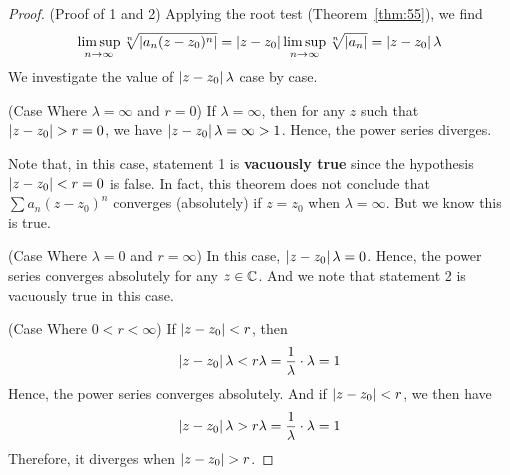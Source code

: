 \documentclass[thmcnt=section, 12pt]{my-elegantbook}
\begin{document}
\begin{proof}
    (Proof of 1 and 2) Applying the root test (Theorem~\ref{thm:55}), we find 
    \begin{align*}
        \limsup_{n \to \infty} \sqrt[n]{\left\lvert a_n(z - z_0)^n \right\rvert}
        = \left\lvert z - z_0 \right\rvert \limsup_{n \to \infty} \sqrt[n]{\left\lvert a_n \right\rvert}
        = \left\lvert z - z_0 \right\rvert \lambda
    \end{align*}
    We investigate the value of $\left\lvert z - z_0 \right\rvert \lambda$ case by case.

    (Case Where $\lambda = \infty$ and $r = 0$) If $\lambda = \infty$, then for any $z$ such that $\left\lvert z - z_0 \right\rvert > r = 0$, we have $\left\lvert z - z_0 \right\rvert \lambda = \infty > 1$. Hence, the power series diverges.
    \begin{note}
        Note that, in this case, statement 1 is \textbf{vacuously true} since the hypothesis $\left\lvert z - z_0 \right\rvert < r = 0$ is false. In fact, this theorem does not conclude that $\sum a_n (z-z_0)^n$ converges (absolutely) if $z = z_0$ when $\lambda = \infty$. But we know this is true.
    \end{note}

    (Case Where $\lambda = 0$ and $r = \infty$) In this case, $\left\lvert z - z_0 \right\rvert \lambda = 0$. Hence, the power series converges absolutely for any $z \in \mathbb{C}$. And we note that statement 2 is vacuously true in this case.

    (Case Where $0 < r < \infty$) If $\left\lvert z-z_0 \right\rvert < r$, then
    \begin{align*}
        \left\lvert z - z_0 \right\rvert \lambda
        < r \lambda
        = \frac{1}{\lambda} \cdot \lambda
        = 1
    \end{align*}
    Hence, the power series converges absolutely. And if $\left\lvert z-z_0 \right\rvert < r$, we then have
    \begin{align*}
        \left\lvert z - z_0 \right\rvert \lambda
        > r \lambda
        = \frac{1}{\lambda} \cdot \lambda
        = 1
    \end{align*}
    Therefore, it diverges when $\left\lvert z - z_0 \right\rvert > r$.


\end{proof}
\end{document}

